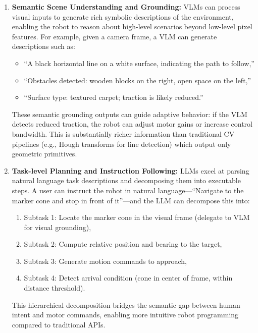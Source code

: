 \begin{enumerate}
    
\item \textbf{Semantic Scene Understanding and Grounding:} VLMs can process visual inputs to generate rich symbolic 
descriptions of the environment, enabling the robot to reason about high-level scenarios beyond low-level pixel 
features. For example, given a camera frame, a VLM can generate descriptions such as:
    \begin{itemize}
        \item ``A black horizontal line on a white surface, indicating the path to follow,''
        \item ``Obstacles detected: wooden blocks on the right, open space on the left,''
        \item ``Surface type: textured carpet; traction is likely reduced.''
    \end{itemize}

These semantic grounding outputs can guide adaptive behavior: if the VLM detects reduced traction, the robot can 
adjust motor gains or increase control bandwidth. This is substantially richer information than traditional CV 
pipelines (e.g., Hough transforms for line detection) which output only geometric primitives.

    
\item \textbf{Task-level Planning and Instruction Following:} LLMs excel at parsing natural language task descriptions 
and decomposing them into executable steps. A user can instruct the robot in natural language—``Navigate to the marker 
cone and stop in front of it''—and the LLM can decompose this into:
    \begin{enumerate}
        \item Subtask 1: Locate the marker cone in the visual frame (delegate to VLM for visual grounding),
        \item Subtask 2: Compute relative position and bearing to the target,
        \item Subtask 3: Generate motion commands to approach,
        \item Subtask 4: Detect arrival condition (cone in center of frame, within distance threshold).
    \end{enumerate}

This hierarchical decomposition bridges the semantic gap between human intent and motor commands, enabling more 
intuitive robot programming compared to traditional APIs.


\end{enumerate}
